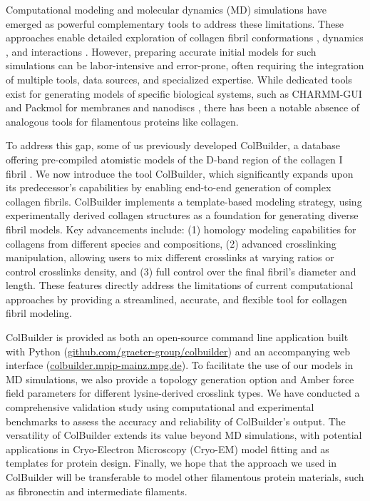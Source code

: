 \documentclass[10pt,letterpaper]{article}
\begin{document}
Computational modeling and molecular dynamics (MD) simulations have emerged as powerful complementary tools to address these limitations. These approaches enable detailed exploration of collagen fibril conformations \cite{streeter2010atomistic, monti2005toward}, dynamics \cite{depalle2015influence,zapp2020mechanoradicals}, and interactions \cite{perumal2008collagen, streeter2011amolecular}. However, preparing accurate initial models for such simulations can be labor-intensive and error-prone, often requiring the integration of multiple tools, data sources, and specialized expertise. While dedicated tools exist for generating models of specific biological systems, such as CHARMM-GUI and Packmol for membranes \cite{lee2018charmm, martinez2009packmol} and nanodiscs \cite{qi2019charmm}, there has been a notable absence of analogous tools for filamentous proteins like collagen.

To address this gap, some of us previously developed ColBuilder, a database offering pre-compiled atomistic models of the D-band region of the collagen I fibril \cite{obarska2021colbuilder}. We now introduce the tool ColBuilder, which significantly expands upon its predecessor's capabilities by enabling end-to-end generation of complex collagen fibrils. ColBuilder implements a template-based modeling strategy, using experimentally derived collagen structures as a foundation for generating diverse fibril models. Key advancements include: (1) homology modeling capabilities for collagens from different species and compositions, (2) advanced crosslinking manipulation, allowing users to mix different crosslinks at varying ratios or control crosslinks density, and (3) full control over the final fibril's diameter and length. These features directly address the limitations of current computational approaches by providing a streamlined, accurate, and flexible tool for collagen fibril modeling.

ColBuilder is provided as both an open-source command line application built with Python (\href{https://github.com/graeter-group/colbuilder}{github.com/graeter-group/colbuilder}) and an accompanying web interface (\href{https://colbuilder.mpip-mainz.mpg.de}{colbuilder.mpip-mainz.mpg.de}). To facilitate the use of our models in MD simulations, we also provide a topology generation option and Amber force field parameters for different lysine-derived crosslink types. We have conducted a comprehensive validation study using computational and experimental benchmarks to assess the accuracy and reliability of ColBuilder's output. The versatility of ColBuilder extends its value beyond MD simulations, with potential applications in Cryo-Electron Microscopy (Cryo-EM) model fitting and as templates for protein design. Finally, we hope that the approach we used in ColBuilder will be transferable to model other filamentous protein materials, such as fibronectin and intermediate filaments.
\end{document}

